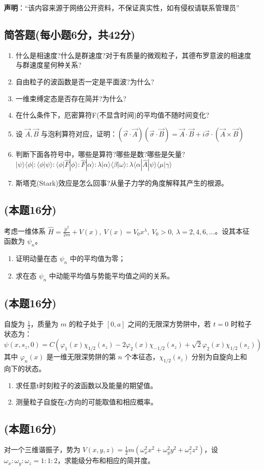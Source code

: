 
\textbf{声明}：“该内容来源于网络公开资料，不保证真实性，如有侵权请联系管理员”

\subsection{简答题(每小题6分，共42分)}
\begin{enumerate}
\item 什么是相速度?什么是群速度?对于有质量的微观粒子，其德布罗意波的相速度与群速度星何种关系?
\item 自由粒子的波函数是否一定是平面波?为什么?
\item 一维束缚定态是否存在简并?为什么?
\item 在什么条件下，厄密算符F(不显含时间)的平均值不随时间变化?
\item 设 $\vec{A}, \vec{B}$ 与泡利算符对应，证明：$\left( \vec{\sigma} \cdot \vec{A} \right) \left( \vec{\sigma} \cdot \vec{B} \right) = \vec{A} \cdot \vec{B} + i \vec{\sigma} \cdot \left( \vec{A} \times \vec{B} \right)$
\item 判断下面各符号中，哪些是算符?哪些是数?哪些是矢量?
$|\psi\rangle\langle\phi| : \langle\phi|\psi\rangle : \langle\phi|\hat{F}|\phi\rangle : \hat{F}|\alpha\rangle : \lambda |\alpha\rangle\langle\beta|\omega\rangle : \lambda \langle\alpha|\hat{A}|\psi\rangle\langle\mu|\gamma\rangle$
\item 斯塔克(Stark)效应是怎么回事?从量子力学的角度解释其产生的根源。
\end{enumerate}
\subsection{(本题16分)}
考虑一维体系 $\hat H = \frac{\dot p^2}{2m} + V(x),\ V(x) = V_0 x^\lambda,\ V_0 > 0,\ \lambda = 2, 4, 6, \ldots$。设其本征函数为 $\psi_n$。
\begin{enumerate}
\item 证明动量在态 $\psi_n$ 中的平均值为零；
\item 求在态 $\psi_n$ 中动能平均值与势能平均值之间的关系。
\end{enumerate}
\subsection{(本题16分)}
自旋为 $\frac{1}{2}$，质量为 $m$ 的粒子处于 $[0,a]$ 之间的无限深方势阱中，若 $t = 0$ 时粒子状态为：
$$\psi(x,s_z,0) = C \left( \varphi_1(x) \chi_{1/2}(s_z) - 2 \varphi_2(x) \chi_{-1/2}(s_z) + \sqrt{2} \varphi_2(x) \chi_{1/2}(s_z) \right)~$$
其中 $\varphi_n(x)$ 是一维无限深势阱的第 $n$ 个本征态，$\chi_{1/2}(s_z)$ 分别为自旋向上和向下的状态。
\begin{enumerate}
\item 求任意t时刻粒子的波函数以及能量的期望值。
\item 测量粒子自旋在z方向的可能取值和相应概率。
\end{enumerate}
\subsection{(本题16分)}
对一个三维谐振子，势为 $V(x, y, z) = \frac{1}{2}m \left( \omega_x^2 x^2 + \omega_y^2 y^2 + \omega_z^2 z^2 \right)$，设 $\omega_x : \omega_y : \omega_z = 1 : 1 : 2$，求能级分布和相应的简并度。